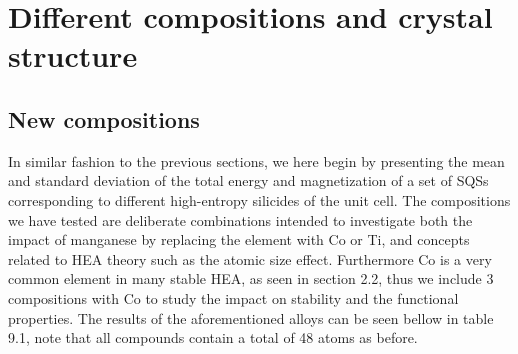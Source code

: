 \chapter{Different compositions and crystal structure}
\label{sec:different}

\section{New compositions}

In similar fashion to the previous sections, we here begin by presenting the mean and standard deviation of the total energy and magnetization of a set of SQSs corresponding to different high-entropy silicides of the  unit cell. The compositions we have tested are deliberate combinations intended to investigate both the impact of manganese by replacing the element with Co or Ti, and concepts related to HEA theory such as the atomic size effect. Furthermore Co is a very common element in many stable HEA, as seen in section 2.2, thus we include 3 compositions with Co to study the impact on stability and the functional properties. The results of the aforementioned alloys can be seen bellow in table 9.1, note that all compounds contain a total of 48 atoms as before.  

